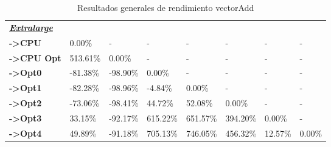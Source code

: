 \begin{table}[H]
\begin{tabular}{llllllll}
    \cellcolor[HTML]{DAE8FC} \textbf{\textbf{{\emph{{\underline{{Extralarge}}}}}}} &  &  &  &  &  &  &  \\
    \rowcolor[HTML]{EFEFEF} \cellcolor[HTML]{DAE8FC} \textbf{->CPU} & 0.00\% & - & - & - & - & - & - \\
    \cellcolor[HTML]{DAE8FC} \textbf{->CPU Opt} & 513.61\% & 0.00\% & - & - & - & - & - \\
    \rowcolor[HTML]{EFEFEF} \cellcolor[HTML]{DAE8FC} \textbf{->Opt0} & -81.38\% & -98.90\% & 0.00\% & - & - & - & - \\
    \cellcolor[HTML]{DAE8FC} \textbf{->Opt1} & -82.28\% & -98.96\% & -4.84\% & 0.00\% & - & - & - \\
    \rowcolor[HTML]{EFEFEF} \cellcolor[HTML]{DAE8FC} \textbf{->Opt2} & -73.06\% & -98.41\% & 44.72\% & 52.08\% & 0.00\% & - & - \\
    \cellcolor[HTML]{DAE8FC} \textbf{->Opt3} & 33.15\% & -92.17\% & 615.22\% & 651.57\% & 394.20\% & 	0.00\% & - \\
    \rowcolor[HTML]{EFEFEF} \cellcolor[HTML]{DAE8FC} \textbf{->Opt4} & 49.89\% & -91.18\% & 705.13\% & 746.05\% & 456.32\% & 	12.57\% & 	0.00\% \\
    \end{tabular}
    \caption[Resultados generales de rendimiento vectorAdd]{{Resultados generales de rendimiento vectorAdd}}
    \label{table_global_vectorAdd_PerformanceResults_speedup}
\end{table}